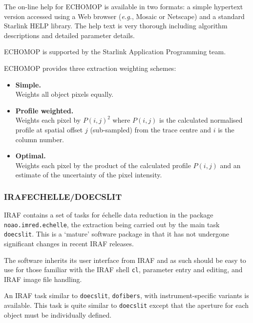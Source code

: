 The on-line help for ECHOMOP is available in two formats: a simple
hypertext version accessed using a Web browser ({\em{e.g.}}, Mosaic or
Netscape) and a standard Starlink HELP library.  The help text is very
thorough including algorithm descriptions and detailed parameter details.

ECHOMOP is supported by the Starlink Application Programming team.

ECHOMOP provides three extraction weighting schemes:

\begin{itemize}

\item {\bf{Simple.}} \mbox{}\\
      Weights all object pixels equally.

\item {\bf{Profile weighted.}} \mbox{}\\
      Weights each pixel by $P(i, j)^{2}$ where $P(i,j)$ is the
      calculated normalised profile at spatial offset $j$ (sub-sampled)
      from the trace centre and $i$ is the column number.

\item {\bf{Optimal.}} \mbox{}\\
      Weights each pixel by the product of the calculated profile
      $P(i,j)$ and an estimate of the uncertainty of the pixel intensity.

\end{itemize}

\subsubsection{\label{se_doecslit}IRAF\sgspec{---}{ - }ECHELLE/DOECSLIT}

IRAF contains a set of tasks for \'{e}chelle data reduction in the package
{\tt noao.imred.echelle}, the extraction being carried out by the main task
{\tt doecslit}\@.  This is a `mature' software package in that it has not
undergone significant changes in recent IRAF releases.

The software inherits its user interface from IRAF and as such should be
easy to use for those familiar with the IRAF shell {\tt cl}, parameter
entry and editing, and IRAF image file handling.

An IRAF task similar to {\tt doecslit}, {\tt dofibers}, with
instrument-specific variants is available.  This task is quite similar to
{\tt doecslit} except that the aperture for each object must be
individually defined.

